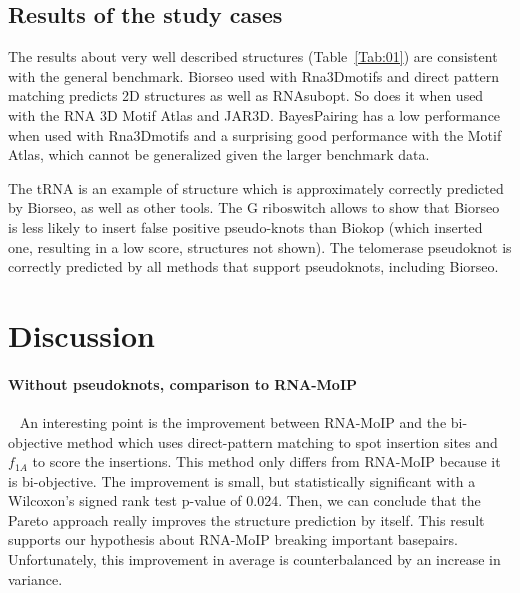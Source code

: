 \documentclass{bioinfo}
\begin{document}
\subsection{Results of the study cases}
The results about very well described structures (Table~\ref{Tab:01}) are consistent with the general benchmark. Biorseo used with Rna3Dmotifs and direct pattern matching predicts 2D structures as well as RNAsubopt. So does it when used with the RNA 3D Motif Atlas and JAR3D.
BayesPairing has a low performance when used with Rna3Dmotifs and a surprising good performance with the Motif Atlas, which cannot be generalized given the larger benchmark data.

The tRNA is an example of structure which is approximately correctly predicted by Biorseo, as well as other tools.
The G riboswitch allows to show that Biorseo is less likely to insert false positive pseudo-knots than Biokop (which inserted one, resulting in a low score, structures not shown). 
The telomerase pseudoknot is correctly predicted by all methods that support pseudoknots, including Biorseo. 


\section{Discussion}

\paragraph{Without pseudoknots, comparison to RNA-MoIP} ~  An interesting point is the improvement between RNA-MoIP and the bi-objective method which uses direct-pattern matching to spot insertion sites and $f_{1A}$ to score the insertions. This method only differs from RNA-MoIP because it is bi-objective. The improvement is small, but statistically significant with a Wilcoxon's signed rank test p-value of 0.024. Then, we can conclude that the Pareto approach really improves the structure prediction by itself. This result supports our hypothesis about RNA-MoIP breaking important basepairs. Unfortunately, this improvement in average is counterbalanced by an increase in variance.
\end{document}
